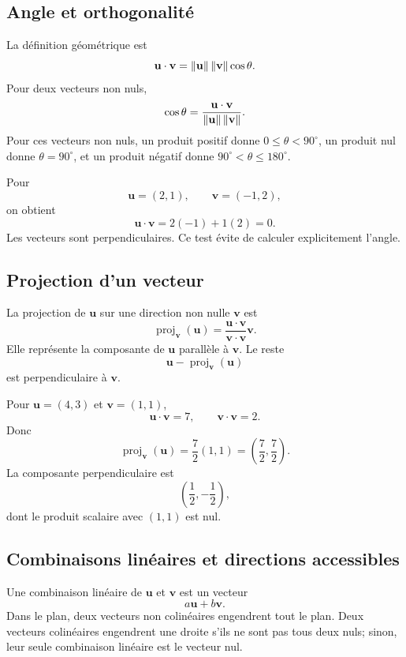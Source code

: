 \subsection{Angle et orthogonalité}

La définition géométrique est
\[
\mathbf u\cdot\mathbf v
=\left\lVert \mathbf u\right\rVert\left\lVert \mathbf v\right\rVert\cos\theta.
\]
Pour deux vecteurs non nuls,
\[
\cos\theta=\frac{\mathbf u\cdot\mathbf v}{\left\lVert \mathbf u\right\rVert\left\lVert \mathbf v\right\rVert}.
\]
Pour ces vecteurs non nuls, un produit positif donne \(0\leq\theta<90^\circ\), un produit nul donne \(\theta=90^\circ\), et un produit négatif donne \(90^\circ<\theta\leq180^\circ\).

\begin{examplebox}
Pour
\[
\mathbf u=(2,1),
\qquad
\mathbf v=(-1,2),
\]
on obtient
\[
\mathbf u\cdot\mathbf v=2(-1)+1(2)=0.
\]
Les vecteurs sont perpendiculaires. Ce test évite de calculer explicitement l'angle.
\end{examplebox}

\subsection{Projection d'un vecteur}

La projection de $\mathbf u$ sur une direction non nulle $\mathbf v$ est
\[
\operatorname{proj}_{\mathbf v}(\mathbf u)
=
\frac{\mathbf u\cdot\mathbf v}{\mathbf v\cdot\mathbf v}\mathbf v.
\]
Elle représente la composante de $\mathbf u$ parallèle à $\mathbf v$. Le reste
\[
\mathbf u-\operatorname{proj}_{\mathbf v}(\mathbf u)
\]
est perpendiculaire à $\mathbf v$.

\begin{examplebox}
Pour $\mathbf u=(4,3)$ et $\mathbf v=(1,1)$,
\[
\mathbf u\cdot\mathbf v=7,
\qquad
\mathbf v\cdot\mathbf v=2.
\]
Donc
\[
\operatorname{proj}_{\mathbf v}(\mathbf u)=\frac72(1,1)=\left(\frac72,\frac72\right).
\]
La composante perpendiculaire est
\[
\left(\frac12,-\frac12\right),
\]
dont le produit scalaire avec $(1,1)$ est nul.
\end{examplebox}

\subsection{Combinaisons linéaires et directions accessibles}

Une combinaison linéaire de $\mathbf u$ et $\mathbf v$ est un vecteur
\[
a\mathbf u+b\mathbf v.
\]
Dans le plan, deux vecteurs non colinéaires engendrent tout le plan. Deux vecteurs colinéaires engendrent une droite s'ils ne sont pas tous deux nuls; sinon, leur seule combinaison linéaire est le vecteur nul.

